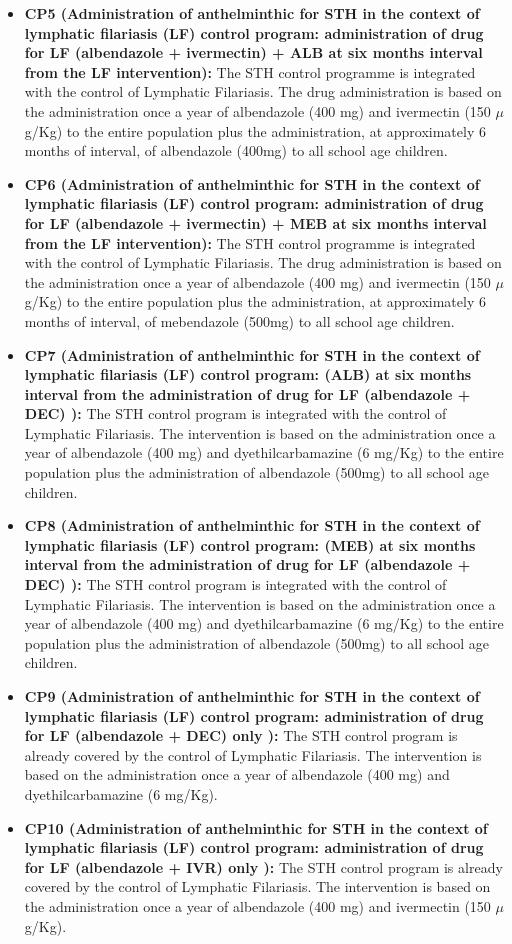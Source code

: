 \documentclass[12pt,oneside]{memoir}
\begin{document}
\begin{itemize}
 \item \textbf{CP5 (Administration of anthelminthic for STH in the context of lymphatic filariasis (LF) control program:  administration of drug for LF (albendazole + ivermectin) + ALB  at six months interval from the LF intervention):} The STH control programme is integrated with the control of Lymphatic Filariasis. The drug administration is based on the administration once a year of albendazole (400 mg) and ivermectin (150 $\mu$g/Kg) to the entire population plus the administration, at approximately 6 months of interval, of albendazole (400mg) to all school age children.
 \item \textbf{CP6 (Administration of anthelminthic for STH in the context of lymphatic filariasis (LF) control program: administration of drug for LF (albendazole + ivermectin) + MEB  at six months interval from the LF intervention):} The STH control programme is integrated with the control of Lymphatic Filariasis. The drug administration is based on the administration once a year of albendazole (400 mg) and ivermectin (150 $\mu$g/Kg) to the entire population plus the administration, at approximately 6 months of interval, of mebendazole (500mg) to all school age children.
 \item \textbf{CP7 (Administration of anthelminthic for STH in the context of lymphatic filariasis (LF) control program: (ALB)  at six months interval from the administration of drug for LF (albendazole + DEC) ):} The STH control program is integrated with the control of Lymphatic Filariasis. The intervention is based on the administration once a year of albendazole (400 mg) and dyethilcarbamazine (6 mg/Kg) to the entire population plus the administration of albendazole (500mg) to all school age children.
 \item \textbf{CP8 (Administration of anthelminthic for STH in the context of lymphatic filariasis (LF) control program: (MEB)  at six months interval from the administration of drug for LF (albendazole + DEC) ):} The STH control program is integrated with the control of Lymphatic Filariasis. The intervention is based on the administration once a year of albendazole (400 mg) and dyethilcarbamazine (6 mg/Kg) to the entire population plus the administration of albendazole (500mg) to all school age children.
 \item \textbf{CP9 (Administration of anthelminthic for STH in the context of lymphatic filariasis (LF) control program: administration of drug for LF (albendazole + DEC)  only ):} The STH control program is already covered by the control of Lymphatic Filariasis. The intervention is based on the administration once a year of albendazole (400 mg) and dyethilcarbamazine (6 mg/Kg).
 \item \textbf{CP10 (Administration of anthelminthic for STH in the context of lymphatic filariasis (LF) control program: administration of drug for LF (albendazole + IVR)  only ):} The STH control program is already covered by the control of Lymphatic Filariasis. The intervention is based on the administration once a year of albendazole (400 mg) and ivermectin (150 $\mu$g/Kg).
\end{itemize}
\end{document}
